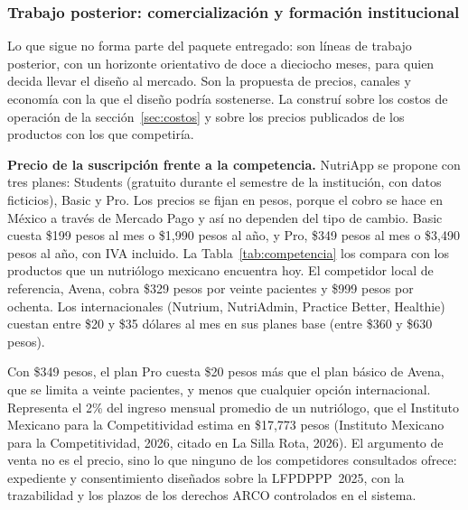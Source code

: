 \documentclass[12pt, a4paper]{article}
\begin{document}
\subsubsection{Trabajo posterior: comercialización y formación institucional}
 
Lo que sigue no forma parte del paquete entregado: son
líneas de trabajo posterior, con un horizonte orientativo de doce a
dieciocho meses, para quien decida llevar el diseño al mercado. Son la propuesta de precios, canales y economía con la que
el diseño podría sostenerse. La construí sobre los costos de operación
de la sección~\ref{sec:costos} y sobre los precios publicados de los
productos con los que competiría.
 
\textbf{Precio de la suscripción frente a la competencia.} NutriApp se
propone con tres planes: Students (gratuito durante el semestre de la
institución, con datos ficticios), Basic y Pro. Los precios se fijan en
pesos, porque el cobro se hace en México a través de Mercado Pago y así
no dependen del tipo de cambio. Basic cuesta \$199 pesos al mes o
\$1,990 pesos al año, y Pro, \$349 pesos al mes o \$3,490 pesos al año,
con IVA incluido. La
Tabla~\ref{tab:competencia} los compara con los productos que un
nutriólogo mexicano encuentra hoy. El competidor local de referencia,
Avena, cobra \$329 pesos por veinte pacientes y \$999 pesos por ochenta.
Los internacionales (Nutrium, NutriAdmin, Practice Better, Healthie)
cuestan entre \$20 y \$35 dólares al mes en sus planes base (entre \$360 y \$630 pesos).

Con \$349 pesos, el plan Pro cuesta \$20 pesos más que el plan básico de
Avena, que se limita a veinte pacientes, y menos que cualquier opción
internacional. Representa el 2\% del ingreso mensual promedio de un
nutriólogo, que el Instituto Mexicano para la Competitividad estima en
\$17,773 pesos (Instituto Mexicano para la Competitividad, 2026, citado
en La Silla Rota, 2026). El argumento de venta no es el precio, sino lo
que ninguno de los competidores consultados ofrece: expediente y
consentimiento diseñados sobre la LFPDPPP~2025, con la
trazabilidad y los plazos de los derechos ARCO controlados en el sistema.
 
\end{document}
